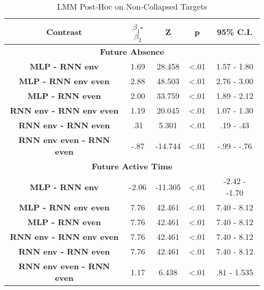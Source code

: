 \begin{table}[h]
\centering
\caption{LMM Post-Hoc on Non-Collapsed Targets}
\label{exploded_post_hoc_33}
\begin{tabular}{ccccc}
\hline
\textbf{Contrast}  & \textbf{$\beta_1$-$\beta_2$} & \textbf{Z} & \textbf{p} & \textbf{95\% C.I.}                  \\ \hline
\multicolumn{5}{c}{\textbf{Future Absence}}                                                                         \\ \hline
\textbf{MLP - RNN env} & 1.69                & 28.458     & \textless .01   & 1.57 - 1.80                    \\
\textbf{MLP - RNN env even}           & 2.88                & 48.503     & \textless .01   & 2.76 - 3.00                     \\
\textbf{MLP - RNN even}           & 2.00                & 33.759     & \textless .01   &  1.89 - 2.12                     \\
\textbf{RNN env - RNN env even}           & 1.19                & 20.045     & \textless .01   & 1.07 - 1.30                     \\
\textbf{RNN env - RNN even}           & .31                & 5.301     & \textless .01   & .19 - .43                     \\
\textbf{RNN env even - RNN even}          & -.87                & -14.744     & \textless .01   & -.99 - -.76                    \\ \hline

\multicolumn{5}{c}{\textbf{Future Active Time}}                                                                     \\ \hline
\textbf{MLP - RNN env} & -2.06                & -11.305     & \textless .01   & -2.42 - -1.70                     \\
\textbf{MLP - RNN env even}           & 7.76                & 42.461     & \textless .01   & 7.40 - 8.12                     \\
\textbf{MLP - RNN even}           & 7.76                & 42.461     & \textless .01   & 7.40 - 8.12                     \\
\textbf{RNN env - RNN env even}           & 7.76                & 42.461     & \textless .01   & 7.40 - 8.12                     \\
\textbf{RNN env - RNN even}           & 7.76                & 42.461     & \textless .01   & 7.40 - 8.12                     \\
\textbf{RNN env even - RNN even}          & 1.17                & 6.438     & \textless .01   & .81 - 1.535                    \\ \hline


\end{tabular}
\end{table}
